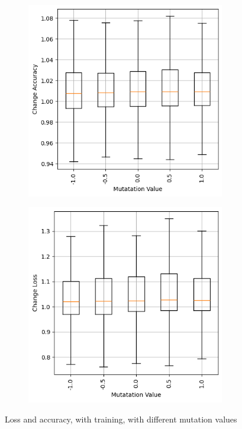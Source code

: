 \begin{figure}
    \begin{subfigure}{0.5\textwidth}
        \centering
        \includegraphics[width=0.95\textwidth]{plots/MutatationValue_Trained_accuracy.png}
    \end{subfigure}
    \begin{subfigure}{0.5\textwidth}
        \centering
        \includegraphics[width=0.95\textwidth]{plots/MutatationValue_Trained_loss.png}
    \end{subfigure}
    \caption{Loss and accuracy, with training, with different mutation values}
    \label{fig:mutation-values-training}
\end{figure}